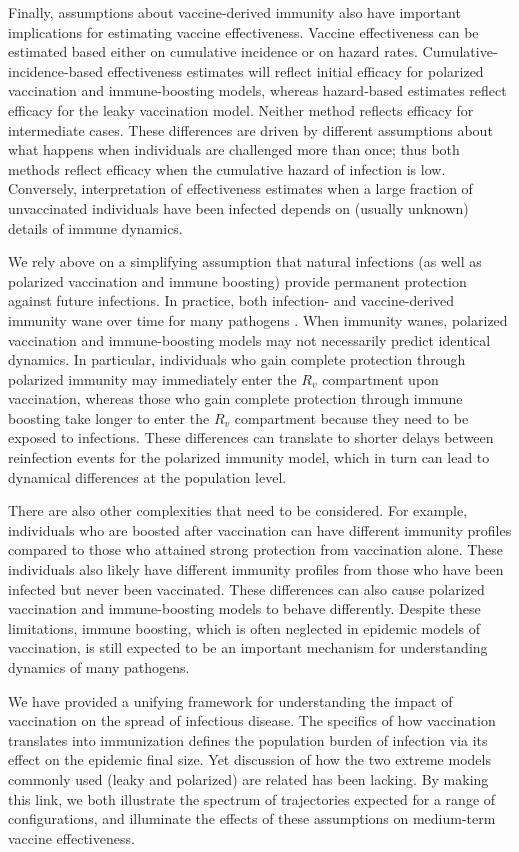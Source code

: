 \documentclass[12pt]{article}
\begin{document}
Finally, assumptions about vaccine-derived immunity also have important implications for estimating vaccine effectiveness.
Vaccine effectiveness can be estimated based either on cumulative incidence or on hazard rates.
Cumulative-incidence-based effectiveness estimates will reflect initial efficacy for polarized vaccination and immune-boosting models,
whereas hazard-based estimates reflect efficacy for the leaky vaccination model.
Neither method reflects efficacy for intermediate cases.
These differences are driven by different assumptions about what happens when individuals are challenged more than once; thus both methods reflect efficacy when the cumulative hazard of infection is low. 
Conversely, interpretation of effectiveness estimates when a large fraction of unvaccinated individuals have been infected depends on (usually unknown) details of immune dynamics.

We rely above on a simplifying assumption that natural infections (as well as polarized vaccination and immune boosting) provide permanent protection against future infections.
In practice, both infection- and vaccine-derived immunity wane over time for many pathogens \citep{heffernan2009implications,lewnard2018vaccine,perez2022}.
When immunity wanes, polarized vaccination and immune-boosting models may not necessarily predict identical dynamics.
In particular, individuals who gain complete protection through polarized immunity may immediately enter the $R_v$ compartment upon vaccination, whereas those who gain complete protection through immune boosting take longer to enter the $R_v$ compartment because they need to be exposed to infections.
These differences can translate to shorter delays between reinfection events for the polarized immunity model, which in turn can lead to dynamical differences at the population level.

There are also other complexities that need to be considered.
For example, individuals who are boosted after vaccination can have different immunity profiles compared to those who attained strong protection from vaccination alone.
These individuals also likely have different immunity profiles from those who have been infected but never been vaccinated.
These differences can also cause polarized vaccination and immune-boosting models to behave differently.
Despite these limitations, immune boosting, which is often neglected in epidemic models of vaccination, is still expected to be an important mechanism for understanding dynamics of many pathogens.

We have provided a unifying framework for understanding the impact of vaccination on the spread of infectious disease.
The specifics of how vaccination translates into immunization defines the population burden of infection via its effect on the epidemic final size.
Yet discussion of how the two extreme models commonly used (leaky and polarized) are related has been lacking.
By making this link, we both illustrate the spectrum of trajectories expected for a range of configurations, and illuminate the effects of these assumptions on medium-term vaccine effectiveness.
\end{document}
